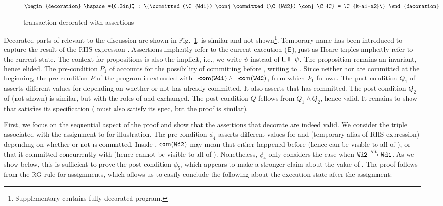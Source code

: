 \begin{figure}
\begin{txnimpcode}
$\begin{decoration}
  \hspace*{0.3in}Q : \{\committed(\C{Wd1}) \conj \committed(\C{Wd2}) \conj
                          \C{C} = \C{k-a1-a2}\}
\end{decoration}$
\end{txnimpcode}

\caption{ transaction decorated with assertions}
\label{fig:wd1-decorated}
\end{figure}

Decorated parts of  relevant to the discussion are shown in
Fig.~\ref{fig:wd1-decorated}.   is similar and not
shown\footnote{Supplementary contains fully decorated program.}.
Temporary name  has been introduced to capture the result of the
RHS expression .  Assertions implicitly refer to the current
execution ($\textsf{E}$), just as Hoare triples implicitly refer to the
current state.  The context for propositions is also the implicit,
i.e., we write $\psi$ instead of $\textsf{E} \Vdash \psi$. The proposition  remains an invariant, hence elided. The pre-condition
$P_1$ of  accounts for the possibility of  committing
before , writing  to . Since neither  nor
 are committed at the beginning, the pre-condition $P$ of the
program is extended with $\neg\textsf{com}({\tt Wd1}) \wedge
\neg\textsf{com}({\tt Wd2})$, from which $P_1$ follows. The post-condition
$Q_1$ of  asserts different values for  depending on
whether or not  has already committed.  It also asserts that
 has committed. The post-condition $Q_2$ of  (not shown)
is similar, but with the roles of  and  exchanged. The
post-condition $Q$ follows from $Q_1 \wedge Q_2$, hence valid. It
remains to show that  satisfies its specification ( must
also satisfy its spec, but the proof is similar).

First, we focus on the sequential aspect of the proof and show that
the assertions that decorate  are indeed valid. We consider the
triple associated with the assignment to  for illustration. The
pre-condition $\phi_4$ asserts different values for  and 
(temporary alias of RHS expression) depending on whether or not
 is committed. Inside , $\textsf{com}({\tt Wd2})$ may mean
that either  happened before  (hence can be visible to
all of ), or that it committed concurrently with  (hence
cannot be visible to all of ).  Nonetheless, $\phi_4$ only
considers the case when ${\tt Wd2} \xrightarrow{\textsf{vis}} {\tt Wd1}$. As we show below,
this is sufficient to prove the post-condition $\phi_5$, which appears
to make a stronger claim about the value of . The proof follows
from the RG rule  for assignments, which allows us
to easily conclude the following about the execution state after the
assignment:

